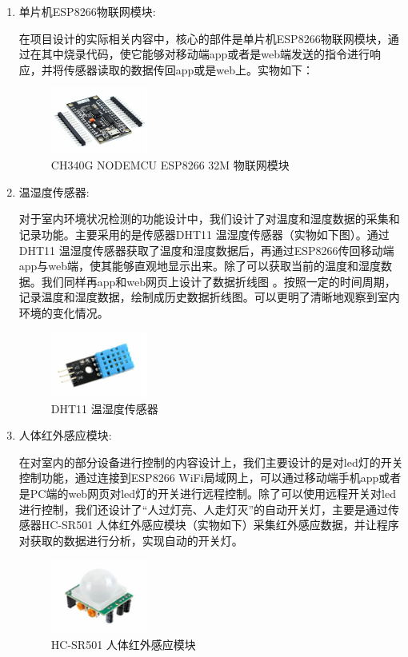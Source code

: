 \begin{enumerate}
    \item {单片机ESP8266物联网模块}: 
    
    在项目设计的实际相关内容中，核心的部件是单片机ESP8266物联网模块，通过在其中烧录代码，使它能够对移动端app或者是web端发送的指令进行响应，并将传感器读取的数据传回app或是web上。实物如下：
    \begin{figure}[htbp]
    \centering
    \includegraphics[width=0.3\textwidth]{figures/esp8266}
    \caption{CH340G NODEMCU ESP8266 32M 物联网模块}\label{fig:3}
    \end{figure}

    \item {温湿度传感器}:
    
    对于室内环境状况检测的功能设计中，我们设计了对温度和湿度数据的采集和记录功能。主要采用的是传感器DHT11 温湿度传感器（实物如下图）。通过DHT11 温湿度传感器获取了温度和湿度数据后，再通过ESP8266传回移动端app与web端，使其能够直观地显示出来。除了可以获取当前的温度和湿度数据。我们同样再app和web网页上设计了数据折线图
。按照一定的时间周期，记录温度和湿度数据，绘制成历史数据折线图。可以更明了清晰地观察到室内环境的变化情况。
    \begin{figure}[htbp]
    \centering
    \includegraphics[width=0.3\textwidth]{figures/dht11}
    \caption{DHT11 温湿度传感器}\label{fig:4}
    \end{figure}

    \item {人体红外感应模块}:
    
    在对室内的部分设备进行控制的内容设计上，我们主要设计的是对led灯的开关控制功能，通过连接到ESP8266 WiFi局域网上，可以通过移动端手机app或者是PC端的web网页对led灯的开关进行远程控制。除了可以使用远程开关对led进行控制，我们还设计了“人过灯亮、人走灯灭”的自动开关灯，主要是通过传感器HC-SR501 人体红外感应模块（实物如下）采集红外感应数据，并让程序对获取的数据进行分析，实现自动的开关灯。
    \begin{figure}[htbp]
    \centering
    \includegraphics[width=0.3\textwidth]{figures/hongwai}
    \caption{HC-SR501 人体红外感应模块}\label{fig:5}
    \end{figure}


\end{enumerate}
